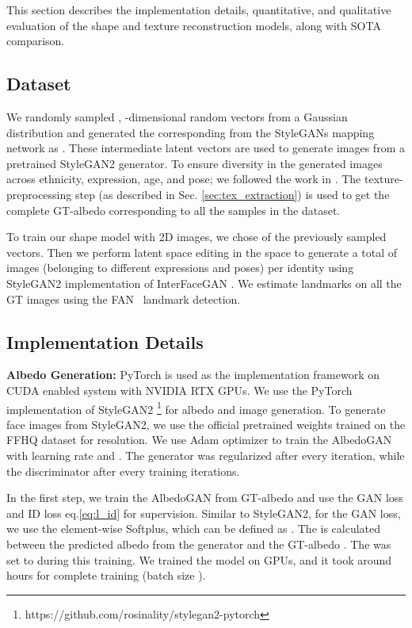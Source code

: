 \documentclass[10pt,twocolumn,letterpaper]{article}
\begin{document}
This section describes the implementation details, quantitative, and qualitative evaluation of the shape and texture reconstruction models, along with SOTA comparison. 











\subsection{Dataset}

We randomly sampled , -dimensional random vectors  from a Gaussian distribution and generated the corresponding  from the StyleGANs mapping network as . These intermediate latent vectors  are used to generate  images  from a pretrained StyleGAN2 \cite{stylegan2} generator. To ensure diversity in the generated images across ethnicity, expression, age, and pose; we followed the work in \cite{rai2021improved}. The texture-preprocessing step (as described in Sec. \ref{sec:tex_extraction}) is used to get the complete GT-albedo corresponding to all the samples in the dataset. 

To train our shape model with 2D images, we chose  of the previously sampled  vectors. Then we perform latent space editing in the  space to generate a total of  images (belonging to different expressions and poses) per identity using StyleGAN2 implementation \cite{rai2021improved} of InterFaceGAN \cite{shen2020interfacegan}. We estimate  landmarks on all the GT images using the FAN~\cite{yin2020fan} landmark detection.   

\subsection{Implementation Details}

{\bf Albedo Generation:} PyTorch \cite{paszke2019pytorch} is used as the implementation framework on CUDA enabled system with NVIDIA RTX  GPUs. We use the PyTorch implementation of StyleGAN2 \footnote{https://github.com/rosinality/stylegan2-pytorch} for albedo and image generation. To generate face images from StyleGAN2, we use the official pretrained weights trained on the FFHQ dataset for  resolution. We use Adam optimizer to train the AlbedoGAN with learning rate  and . The generator was regularized after every  iteration, while the discriminator after every  training iterations. 

In the first step, we train the AlbedoGAN from GT-albedo and use the GAN loss and ID loss eq.\ref{eq:l_id} for supervision. Similar to StyleGAN2, for the GAN loss, we use the element-wise Softplus, which can be defined as .  The  is calculated between the predicted albedo from the generator  and the GT-albedo . The  was set to  during this training. We trained the model on  GPUs, and it took around  hours for complete training (batch size ).
\end{document}
